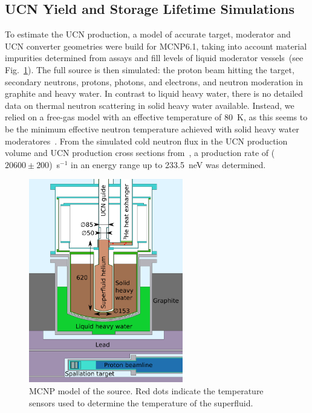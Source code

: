 \subsection{UCN Yield and Storage Lifetime Simulations~\label{sec:yieldsims}}
To estimate the UCN production, a model of accurate target, moderator
and UCN converter geometries were build for MCNP6.1, taking into
account material impurities determined from assays and fill levels of
liquid moderator vessels~(see Fig.~\ref{fig:mcnpmodel}). The full
source is then simulated: the proton beam hitting the target,
secondary neutrons, protons, photons, and electrons, and neutron
moderation in graphite and heavy water. In contrast to liquid heavy
water, there is no detailed data on thermal neutron scattering in
solid heavy water available. Instead, we relied on a free-gas model
with an effective temperature of 80~K, as this seems to be the minimum
effective neutron temperature achieved with solid heavy water
moderatores~\cite{rush1966}. From the simulated cold neutron flux in
the UCN production volume and UCN production cross sections
from~\cite{Schmidt2015,Korobkina2002}, a production rate of
($20600\pm 200$)~s$^{-1}$ in an energy range up to 233.5~neV was
determined.

\begin{figure}[h!]
  \centering
  \includegraphics[width=0.6\textwidth]{MCNPmodel.pdf}
  \caption[MCNP model of the UCN source]{MCNP model of the source. Red
    dots indicate the temperature sensors used to determine the
    temperature of the superfluid.}
  \label{fig:mcnpmodel}
\end{figure}



